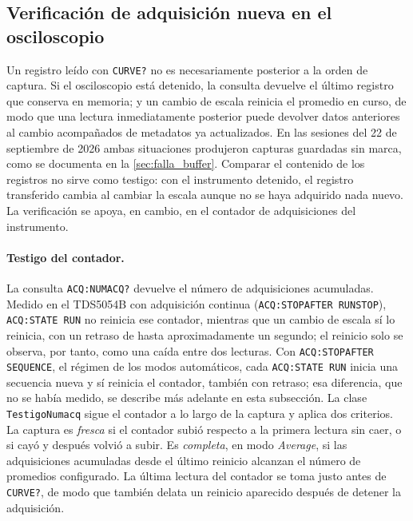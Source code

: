 \subsection{Verificación de adquisición nueva en el osciloscopio}
\label{sec:verificacion_adquisicion}

Un registro leído con \texttt{CURVE?} no es necesariamente posterior a
la orden de captura. Si el osciloscopio está detenido, la consulta
devuelve el último registro que conserva en memoria; y un cambio de
escala reinicia el promedio en curso, de modo que una lectura
inmediatamente posterior puede devolver datos anteriores al cambio
acompañados de metadatos ya actualizados. En las sesiones del 22 de
septiembre de 2026 ambas situaciones produjeron capturas guardadas sin
marca, como se documenta en la \cref{sec:falla_buffer}. Comparar el
contenido de los registros no sirve como testigo: con el instrumento
detenido, el registro transferido cambia al cambiar la escala aunque
no se haya adquirido nada nuevo. La verificación se apoya, en cambio,
en el contador de adquisiciones del instrumento.

\paragraph{Testigo del contador.} La consulta \texttt{ACQ:NUMACQ?}
devuelve el número de adquisiciones acumuladas. Medido en el
TDS5054B con adquisición continua (\texttt{ACQ:STOPAFTER RUNSTOP}),
\texttt{ACQ:STATE RUN} no reinicia ese contador, mientras que un
cambio de escala sí lo reinicia, con un retraso de hasta
aproximadamente un segundo; el reinicio solo se observa, por tanto,
como una caída entre dos lecturas. Con \texttt{ACQ:STOPAFTER
SEQUENCE}, el régimen de los modos automáticos, cada
\texttt{ACQ:STATE RUN} inicia una secuencia nueva y sí reinicia el
contador, también con retraso; esa diferencia, que no se había medido,
se describe más adelante en esta subsección. La clase \texttt{TestigoNumacq}
sigue el contador a lo largo de la captura y aplica dos criterios. La
captura es \emph{fresca} si el contador subió respecto a la primera
lectura sin caer, o si cayó y después volvió a subir. Es
\emph{completa}, en modo \textit{Average}, si las adquisiciones
acumuladas desde el último reinicio alcanzan el número de promedios
configurado. La última lectura del contador se toma justo antes de
\texttt{CURVE?}, de modo que también delata un reinicio aparecido
después de detener la adquisición.

